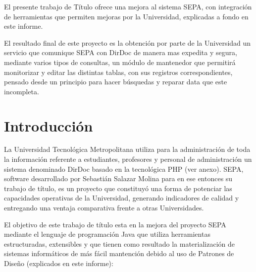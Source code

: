 \documentclass[a4paper,12pt,openany,oneside]{book}
\begin{document}

El presente trabajo de Título ofrece una mejora al sistema SEPA, con integración de herramientas que permiten mejoras por la Universidad, explicadas a fondo en este informe.

El resultado final de este proyecto es la obtención por parte de la Universidad un servicio que comunique SEPA con DirDoc de manera mas expedita y segura, mediante varios tipos de consultas, un módulo de mantenedor que permitirá monitorizar y editar las distintas tablas, con sus registros correspondientes, pensado desde un principio para hacer búsquedas y reparar data que este incompleta.

\tableofcontents
\listoffigures
\listoftables
\chapter*{Introducción}
\thispagestyle{empty}
La Universidad Tecnológica Metropolitana utiliza para la administración de toda la información referente a estudiantes, profesores y personal de administración un sistema denominado DirDoc basado en la tecnológica PHP (ver anexo). SEPA, software desarrollado por Sebastián Salazar Molina para en ese entonces su trabajo de título, es un proyecto que constituyó una forma de potenciar las capacidades operativas de la Universidad, generando indicadores de calidad y entregando una ventaja comparativa frente a otras Universidades.

El objetivo de este trabajo de título esta en la mejora del proyecto SEPA mediante el lenguaje de programación Java que utiliza herramientas estructuradas, extensibles y que tienen como resultado la materialización de sistemas informáticos de más fácil mantención debido al uso de Patrones de Diseño (explicados en este informe):
\end{document}
